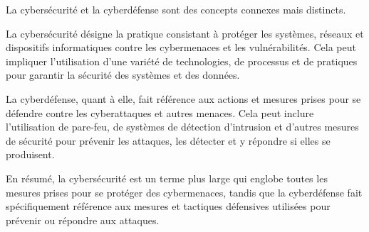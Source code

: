 La cybersécurité et la cyberdéfense sont des concepts connexes mais distincts.

La cybersécurité désigne la pratique consistant à protéger les systèmes, réseaux et dispositifs informatiques contre les cybermenaces et les vulnérabilités. Cela peut impliquer l'utilisation d'une variété de technologies, de processus et de pratiques pour garantir la sécurité des systèmes et des données.

La cyberdéfense, quant à elle, fait référence aux actions et mesures prises pour se défendre contre les cyberattaques et autres menaces. Cela peut inclure l'utilisation de pare-feu, de systèmes de détection d'intrusion et d'autres mesures de sécurité pour prévenir les attaques, les détecter et y répondre si elles se produisent.

En résumé, la cybersécurité est un terme plus large qui englobe toutes les mesures prises pour se protéger des cybermenaces, tandis que la cyberdéfense fait spécifiquement référence aux mesures et tactiques défensives utilisées pour prévenir ou répondre aux attaques.